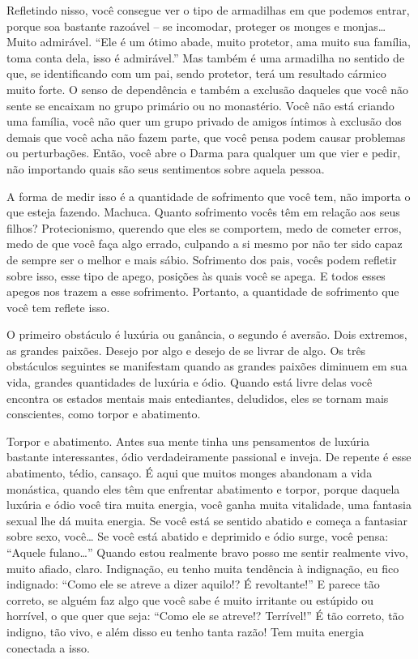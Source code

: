 Refletindo nisso, você consegue ver o tipo de armadilhas em que
podemos entrar, porque soa bastante razoável – se incomodar, proteger
os monges e monjas… Muito admirável. “Ele é um ótimo abade, muito
protetor, ama muito sua família, toma conta dela, isso é admirável.”
Mas também é uma armadilha no sentido de que, se identificando com um
pai, sendo protetor, terá um resultado cármico muito forte. O senso de
dependência e também a exclusão daqueles que você não sente se encaixam
no grupo primário ou no monastério. Você não está criando uma família,
você não quer um grupo privado de amigos íntimos à exclusão dos demais
que você acha não fazem parte, que você pensa podem causar problemas ou
perturbações. Então, você abre o Darma para qualquer um que vier e
pedir, não importando quais são seus sentimentos sobre aquela pessoa.

A forma de medir isso é a quantidade de sofrimento que você tem, não
importa o que esteja fazendo. Machuca. Quanto sofrimento vocês têm em
relação aos seus filhos? Protecionismo, querendo que eles se comportem,
medo de cometer erros, medo de que você faça algo errado, culpando a si
mesmo por não ter sido capaz de sempre ser o melhor e mais sábio.
Sofrimento dos pais, vocês podem refletir sobre isso, esse tipo de
apego, posições às quais você se apega. E todos esses apegos nos trazem
a esse sofrimento. Portanto, a quantidade de sofrimento que você tem
reflete isso. 

O primeiro obstáculo é luxúria ou ganância, o segundo é aversão.
Dois extremos, as grandes paixões. Desejo por algo e desejo de se
livrar de algo. Os três obstáculos seguintes se manifestam quando as
grandes paixões diminuem em sua vida, grandes quantidades de luxúria e
ódio. Quando está livre delas você encontra os estados mentais mais
entediantes, deludidos, eles se tornam mais conscientes, como torpor e
abatimento.

Torpor e abatimento. Antes sua mente tinha uns pensamentos de
luxúria bastante interessantes, ódio verdadeiramente passional e
inveja. De repente é esse abatimento, tédio, cansaço. É aqui que muitos
monges abandonam a vida monástica, quando eles têm que enfrentar
abatimento e torpor, porque daquela luxúria e ódio você tira muita
energia, você ganha muita vitalidade, uma fantasia sexual lhe dá muita
energia. Se você está se sentido abatido e começa a fantasiar sobre
sexo, você… Se você está abatido e deprimido e ódio surge, você pensa:
“Aquele fulano…” Quando estou realmente bravo posso me sentir realmente
vivo, muito afiado, claro. Indignação, eu tenho muita tendência à
indignação, eu fico indignado: “Como ele se atreve a dizer aquilo!? É
revoltante!” E parece tão correto, se alguém faz algo que você sabe é
muito irritante ou estúpido ou horrível, o que quer que seja: “Como ele
se atreve!? Terrível!” É tão correto, tão indigno, tão vivo, e além
disso eu tenho tanta razão! Tem muita energia conectada a isso.

